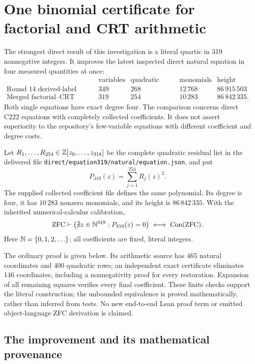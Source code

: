 \section{One binomial certificate for factorial and CRT arithmetic}
\label{sec:direct319}

The strongest direct result of this investigation is a literal quartic in
319 nonnegative integers. It improves the latest inspected direct natural
equation in four measured quantities at once:
\[
\begin{array}{lrrrr}
 &\text{variables}&\text{quadratic rows}&\text{monomials}&\text{height}\\
\text{Round 14 derived-label source}&349&268&12\,768&86\,915\,503\\
\text{Merged factorial--CRT source}&319&254&10\,283&86\,842\,335.
\end{array}
\]
Both single equations have exact degree four. The comparison concerns
direct C222 equations with completely collected coefficients. It does not
assert superiority to the repository's few-variable equations with different
coefficient and degree costs.

\begin{theorem}\label{thm:direct319}
Let $R_1,\ldots,R_{254}\in\mathbb Z[z_0,\ldots,z_{318}]$ be the complete quadratic
residual list in the delivered file
\texttt{direct/equation319/natural/equation.json}, and put
\[
             P_{319}(z)=\sum_{j=1}^{254}R_j(z)^2.
\]
The supplied collected coefficient file defines the same polynomial.
Its degree is four, it has $10\,283$ nonzero monomials, and its height is
$86\,842\,335$. With the inherited numerical-calculus calibration,
\[
 \mathrm{ZFC}\vdash
 \bigl(\nexists z\in\mathbb N^{319}:P_{319}(z)=0\bigr)
       \ \longleftrightarrow\ \operatorname{Con}(\mathrm{ZFC}).
\]
Here $\mathbb N=\{0,1,2,\ldots\}$; all coefficients are fixed, literal integers.
\end{theorem}

The ordinary proof is given below. Its arithmetic source has 465 natural
coordinates and 400 quadratic rows; an independent exact certificate
eliminates 146 coordinates, including a nonnegativity proof for every
restoration. Expansion of all remaining squares verifies every final
coefficient. These finite checks support the literal construction; the
unbounded equivalence is proved mathematically, rather than inferred from
tests. No new end-to-end Lean proof term or emitted object-language ZFC
derivation is claimed.

\subsection{The improvement and its mathematical provenance}

